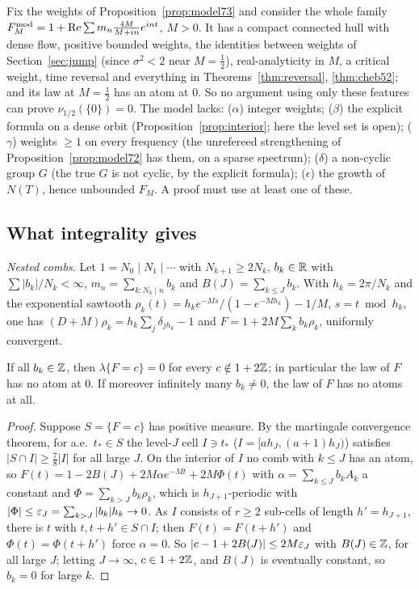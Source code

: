 \begin{remark}
Fix the weights of Proposition~\ref{prop:model73} and consider the whole family $F^{\rm mod}_M=1+\operatorname{Re}\sum m_n\frac{4M}{M+in}e^{int}$, $M>0$. It has a compact connected hull with dense flow, positive bounded weights, the identities between weights of Section~\ref{sec:jump} (since $\sigma^2<2$ near $M=\frac12$), real-analyticity in $M$, a critical weight, time reversal and everything in Theorems~\ref{thm:reversal}, \ref{thm:cheb52}; and its law at $M=\frac12$ has an atom at $0$. So no argument using only these features can prove $\nu_{1/2}(\{0\})=0$. The model lacks: ($\alpha$) integer weights; ($\beta$) the explicit formula on a dense orbit (Proposition~\ref{prop:interior}; here the level set is open); ($\gamma$) weights $\ge1$ on every frequency (the unrefereed strengthening of Proposition~\ref{prop:model72} has them, on a sparse spectrum); ($\delta$) a non-cyclic group $G$ (the true $G$ is not cyclic, by the explicit formula); ($\epsilon$) the growth of $N(T)$, hence unbounded $F_M$. A proof must use at least one of these.
\end{remark}

\subsection{What integrality gives}\label{sec:integrality}
\emph{Nested combs.} Let $1=N_0\mid N_1\mid\cdots$ with $N_{k+1}\ge2N_k$, $b_k\in\mathbb R$ with $\sum|b_k|/N_k<\infty$, $m_n=\sum_{k:N_k\mid n}b_k$ and $B(J)=\sum_{k\le J}b_k$. With $h_k=2\pi/N_k$ and the exponential sawtooth $\rho_k(t)=h_ke^{-Ms}/(1-e^{-Mh_k})-1/M$, $s=t\bmod h_k$, one has $(D+M)\rho_k=h_k\sum_j\delta_{jh_k}-1$ and $F=1+2M\sum_kb_k\rho_k$, uniformly convergent.

\begin{theorem}\label{thm:nested}
If all $b_k\in\mathbb Z$, then $\lambda\{F=c\}=0$ for every $c\notin1+2\mathbb Z$; in particular the law of $F$ has no atom at $0$. If moreover infinitely many $b_k\ne0$, the law of $F$ has no atoms at all.
\end{theorem}

\begin{proof}
Suppose $S=\{F=c\}$ has positive measure. By the martingale convergence theorem, for a.e.\ $t_*\in S$ the level-$J$ cell $I\ni t_*$ ($I=[ah_J,(a+1)h_J)$) satisfies $|S\cap I|\ge\frac78|I|$ for all large $J$. On the interior of $I$ no comb with $k\le J$ has an atom, so $F(t)=1-2B(J)+2M\alpha e^{-Mt}+2M\Phi(t)$ with $\alpha=\sum_{k\le J}b_kA_k$ a constant and $\Phi=\sum_{k>J}b_k\rho_k$, which is $h_{J+1}$-periodic with $|\Phi|\le\varepsilon_J=\sum_{k>J}|b_k|h_k\to0$. As $I$ consists of $r\ge2$ sub-cells of length $h'=h_{J+1}$, there is $t$ with $t,t+h'\in S\cap I$; then $F(t)=F(t+h')$ and $\Phi(t)=\Phi(t+h')$ force $\alpha=0$. So $|c-1+2B(J)|\le2M\varepsilon_J$ with $B(J)\in\mathbb Z$, for all large $J$; letting $J\to\infty$, $c\in1+2\mathbb Z$, and $B(J)$ is eventually constant, so $b_k=0$ for large $k$.
\end{proof}

